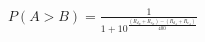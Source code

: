 \documentclass[preview]{standalone}
\begin{document}
\begin{align*}
P(A > B) = \frac{1}{1 + 10^{\frac{(R_{d_B} + R_{c_B}) - (R_{d_A} + R_{c_A})}{400}}}
\end{align*}
\end{document}
